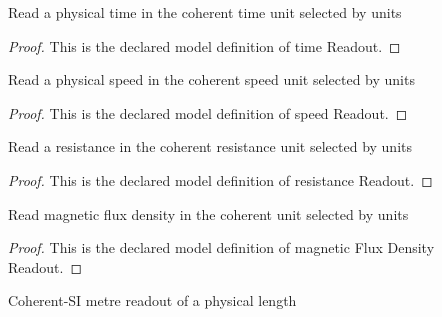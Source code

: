 \begin{definition}
  \label{def:physics:phyx-mini-0884:phyxminiproblems-problemphyxmini0884-timereadout}
  Read a physical time in the coherent time unit selected by units
\end{definition}
\begin{proof}
  This is the declared model definition of time Readout.
\end{proof}
\begin{definition}
  \label{def:physics:phyx-mini-0884:phyxminiproblems-problemphyxmini0884-speedreadout}
  Read a physical speed in the coherent speed unit selected by units
\end{definition}
\begin{proof}
  This is the declared model definition of speed Readout.
\end{proof}
\begin{definition}
  \label{def:physics:phyx-mini-0884:phyxminiproblems-problemphyxmini0884-resistancereadout}
  Read a resistance in the coherent resistance unit selected by units
\end{definition}
\begin{proof}
  This is the declared model definition of resistance Readout.
\end{proof}
\begin{definition}
  \label{def:physics:phyx-mini-0884:phyxminiproblems-problemphyxmini0884-magneticfluxdensityreadout}
  Read magnetic flux density in the coherent unit selected by units
\end{definition}
\begin{proof}
  This is the declared model definition of magnetic Flux Density Readout.
\end{proof}
\begin{definition}
  \label{def:physics:phyx-mini-0884:phyxminiproblems-problemphyxmini0884-lengthinmeters}
  Coherent-SI metre readout of a physical length
\end{definition}
